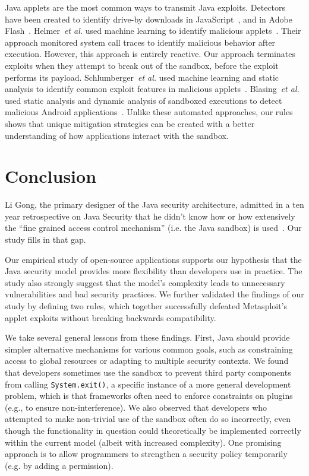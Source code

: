 \documentclass{sig-alternate}
\begin{document}
Java applets are the most common ways to transmit Java exploits. Detectors
have been created to identify drive-by downloads in JavaScript~\cite{cova_detection_2010},
and in Adobe Flash~\cite{ford_analyzing_2009}. Helmer~\emph{et al.} used
machine learning to identify malicious applets~\cite{helmer_anomalous_2001}.
Their approach monitored system call traces to identify malicious
behavior after execution. However, this approach is entirely reactive.
Our approach terminates exploits when they attempt to break out of
the sandbox, before the exploit performs its payload. Schlumberger~\emph{et al.} used machine learning and static analysis to identify common
exploit features in malicious applets~\cite{schlumberger_jarhead_2012}.
Blasing~\emph{et al.} used static analysis and dynamic analysis of sandboxed
executions to detect malicious Android applications~\cite{Blasing-AndriodSandbox}.
Unlike these automated approaches, our rules shows that unique
mitigation strategies can be created with a better understanding of
how applications interact with the sandbox. 

\section{Conclusion}\label{sec:Conclusion}

Li Gong, the primary designer of the Java security architecture,
admitted in a ten year retrospective on Java Security that he didn't
know how or how extensively the ``fine grained access control mechanism''
(i.e. the Java sandbox) is used~\cite{gong2009java}.
Our study fills in that gap.

Our empirical study of open-source applications
supports our hypothesis that the Java security
model provides more flexibility than developers use in practice.  The study also
strongly suggest that the model's complexity leads to unnecessary 
vulnerabilities and bad security practices. 
We further validated the findings of our study by defining two rules, which together successfully
defeated Metasploit's applet exploits without breaking backwards compatibility.

We take several general lessons from these findings.  First, Java should provide 
simpler alternative mechanisms for various common goals, such as constraining 
access to global resources or adapting to multiple security contexts. 
We found that developers sometimes use the sandbox to prevent third party components from calling
\texttt{System.exit()}, a specific instance of a more general development
problem, which is that frameworks often need to enforce constraints on plugins
(e.g., to ensure non-interference).  We also observed that developers who attempted
to make non-trivial use of the sandbox often do so incorrectly, even though
the functionality in question could theoretically be implemented correctly
within the current model (albeit with increased complexity). 
One promising approach is to allow programmers
to strengthen a security policy temporarily (e.g. by adding a permission). 
\end{document}
